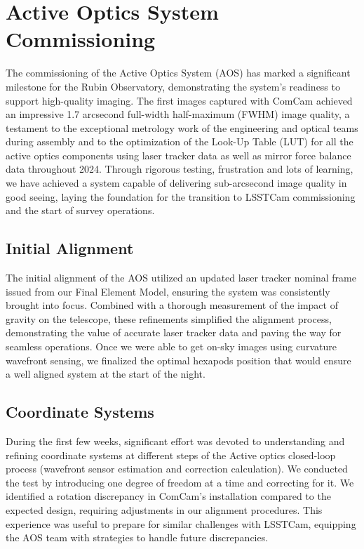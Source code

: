 \section{Active Optics System Commissioning}
\label{sec:aos_commissioning}

The commissioning of the Active Optics System (AOS) has marked a significant milestone for the Rubin Observatory, 
demonstrating the system's readiness to support high-quality imaging. The first images captured with ComCam 
achieved an impressive 1.7 arcsecond full-width half-maximum (FWHM) image quality, a testament to the exceptional metrology
work of the engineering and optical teams during assembly and to the optimization of the Look-Up Table (LUT) for all the active optics components using 
laser tracker data as well as mirror force balance data throughout 2024. Through rigorous testing, frustration and lots of learning, 
we have achieved a system capable of delivering sub-arcsecond image quality in good seeing, 
laying the foundation for the transition to LSSTCam commissioning and the start of survey operations.

\subsection{Initial Alignment}
The initial alignment of the AOS utilized an updated laser tracker nominal frame issued from our Final Element Model, ensuring the system was 
consistently brought into focus. Combined with a thorough measurement of the impact of gravity on the telescope, 
these refinements simplified the alignment process, demonstrating the 
value of accurate laser tracker data and paving the way for seamless operations.
Once we were able to get on-sky images using curvature wavefront sensing, we finalized the optimal hexapods position that would ensure a well aligned system at the start of the night. 

\subsection{Coordinate Systems}
During the first few weeks, significant effort was devoted to understanding and refining coordinate systems at different steps of the Active optics closed-loop process (wavefront sensor estimation and correction calculation). We conducted the test by introducing one degree of freedom at a time and correcting for it. 
We identified a rotation discrepancy in ComCam's installation compared to the expected design, requiring 
adjustments in our alignment procedures. This experience was useful to prepare for similar challenges 
with LSSTCam, equipping the AOS team with strategies to handle future discrepancies. 

